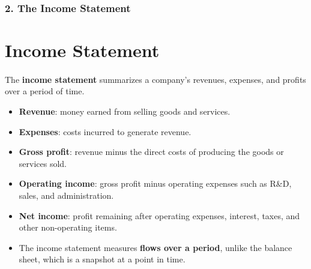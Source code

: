 \documentclass{beamer}
\begin{document}
\begin{frame}[t]
    \frametitle{2. The Income Statement}
    \section{Income Statement}
    \framesubtitle{}

    The \textbf{income statement} summarizes a company's revenues,
    expenses, and profits over a period of time.

    \vspace{1em}

    \begin{itemize}
        \item \textbf{Revenue}: money earned from selling goods and services.

        \item \textbf{Expenses}: costs incurred to generate revenue.

        \item \textbf{Gross profit}: revenue minus the direct costs of
        producing the goods or services sold.

        \item \textbf{Operating income}: gross profit minus operating
        expenses such as R\&D, sales, and administration.

        \item \textbf{Net income}: profit remaining after operating expenses,
        interest, taxes, and other non-operating items.

        \item The income statement measures \textbf{flows over a period},
        unlike the balance sheet, which is a snapshot at a point in time.
    \end{itemize}

\end{frame}
\end{document}

